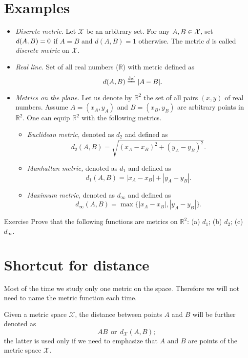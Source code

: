 \section*{Examples}

\begin{itemize}
\item {}\emph{Discrete metric.} Let $\mathcal X$ be an arbitrary set. 
For any $A,B\z\in\mathcal X$, 
set $d(A,B)\z=0$ if $A=B$ and $d(A,B)=1$ otherwise.
The metric $d$ is called \emph{discrete metric} on $\mathcal X$.
\item{}\emph{Real line.} Set of all real numbers ($\mathbb{R}$) with metric defined as 
$$d(A,B)\df|A-B|.$$
\item {}\emph{Metrics on the plane.}
Let us denote by $\mathbb{R}^2$ the set of all pairs $(x,y)$ of real numbers.
Assume $A=(x_A,y_A)$ and $B=(x_B,y_B)$ are arbitrary points in $\mathbb{R}^2$.
One can equip $\mathbb{R}^2$ with the following metrics.
\begin{itemize}
\item{}\emph{Euclidean metric,} denoted as $d_2$ and defined as \label{def:d_2}
$$d_2(A,B)=\sqrt{(x_A-x_B)^2+(y_A-y_B)^2}.$$
\item{}\emph{Manhattan metric,} denoted as $d_1$ and defined as 
$$d_1(A,B)=|x_A-x_B|+|y_A-y_B|.$$
\item{}\emph{Maximum metric,} denoted as $d_\infty$ and defined as 
$$d_\infty(A,B)=\max\{|x_A-x_B|,|y_A-y_B|\}.$$
\end{itemize}
\end{itemize}

\begin{thm}{Exercise}\label{ex:d_1+d_2+d_infty}
Prove that the following functions are metrics on $\mathbb{R}^2$:
(a) $d_1$; (b) $d_2$; (c) $d_\infty$.
\end{thm}


\section*{Shortcut for distance}

Most of the time  
we study only one metric on the space.
Therefore we will not need to name the metric function each time.

Given a metric space $\mathcal X$,
the distance between points $A$ and $B$ will be further denoted as $$AB\ \ \text{or}\ \ d_{\mathcal X}(A,B);$$
the latter is used only if we need to emphasize that $A$ and $B$ are points of the metric space $\mathcal X$.

